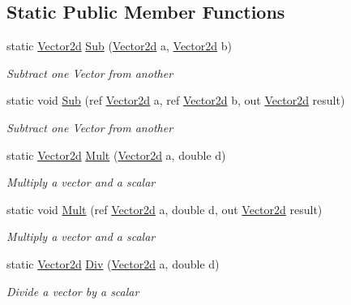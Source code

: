 \subsection*{Static Public Member Functions}
\begin{DoxyCompactItemize}
\item 
static \hyperlink{struct_open_t_k_1_1_vector2d}{Vector2d} \hyperlink{struct_open_t_k_1_1_vector2d_a590ffd8418e1905e0e00e1a9d418a1d9}{Sub} (\hyperlink{struct_open_t_k_1_1_vector2d}{Vector2d} a, \hyperlink{struct_open_t_k_1_1_vector2d}{Vector2d} b)
\begin{DoxyCompactList}\small\item\em Subtract one Vector from another \end{DoxyCompactList}\item 
static void \hyperlink{struct_open_t_k_1_1_vector2d_a729dd99b0789cf7113f87f678f63db9c}{Sub} (ref \hyperlink{struct_open_t_k_1_1_vector2d}{Vector2d} a, ref \hyperlink{struct_open_t_k_1_1_vector2d}{Vector2d} b, out \hyperlink{struct_open_t_k_1_1_vector2d}{Vector2d} result)
\begin{DoxyCompactList}\small\item\em Subtract one Vector from another \end{DoxyCompactList}\item 
static \hyperlink{struct_open_t_k_1_1_vector2d}{Vector2d} \hyperlink{struct_open_t_k_1_1_vector2d_a2ef7c5f5c0272bf301c939d9265bdf70}{Mult} (\hyperlink{struct_open_t_k_1_1_vector2d}{Vector2d} a, double d)
\begin{DoxyCompactList}\small\item\em Multiply a vector and a scalar \end{DoxyCompactList}\item 
static void \hyperlink{struct_open_t_k_1_1_vector2d_a3131fe454013b47008690fba20d44874}{Mult} (ref \hyperlink{struct_open_t_k_1_1_vector2d}{Vector2d} a, double d, out \hyperlink{struct_open_t_k_1_1_vector2d}{Vector2d} result)
\begin{DoxyCompactList}\small\item\em Multiply a vector and a scalar \end{DoxyCompactList}\item 
static \hyperlink{struct_open_t_k_1_1_vector2d}{Vector2d} \hyperlink{struct_open_t_k_1_1_vector2d_a0d626b8988d598f950b92fe7db3feb97}{Div} (\hyperlink{struct_open_t_k_1_1_vector2d}{Vector2d} a, double d)
\begin{DoxyCompactList}\small\item\em Divide a vector by a scalar \end{DoxyCompactList}\item 

\end{DoxyCompactItemize}
